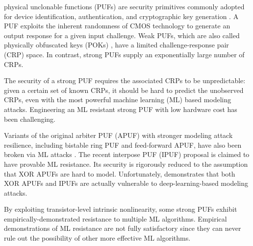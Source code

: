  physical unclonable functions (PUFs) are security primitives commonly adopted for device identification, authentication, and cryptographic key generation \cite{suh2007physical}.
A PUF exploits the inherent randomness of CMOS technology to generate an output response for a given input challenge. 
Weak PUFs, which are also called physically obfuscated keys (POKs) \cite{herder2017trapdoor}, have a limited challenge-response pair (CRP) space. 
In contrast, strong PUFs supply an exponentially large number of CRPs.

The security of a strong PUF requires the associated CRPs to be unpredictable: given a certain set of known CRPs, it should be hard to predict the unobserved CRPs, even with the most powerful machine learning (ML) based modeling attacks. 
Engineering an ML resistant strong PUF with low hardware cost has been challenging. 

Variants of the original arbiter PUF (APUF) with stronger modeling attack resilience, including bistable ring PUF and feed-forward APUF, have also been broken via  ML attacks \cite{schuster2014evaluation, ruhrmair2010modeling}. 
The recent interpose PUF (IPUF) \cite{nguyen2019interpose} proposal is claimed to have provable ML resistance. 
Its security is rigorously reduced to the assumption that XOR APUFs are hard to model. 
Unfortunately, \cite{DBLP:journals/iacr/SantikellurBC19} demonstrates that both XOR APUFs and IPUFs are actually vulnerable to deep-learning-based modeling attacks.

By exploiting transistor-level intrinsic nonlinearity, some strong PUFs \cite{kumar2014design, zhuang2019strong} exhibit empirically-demonstrated resistance to multiple ML algorithms. 
Empirical demonstrations of ML resistance are not fully satisfactory since they can never rule out the possibility of other more effective ML algorithms. 

